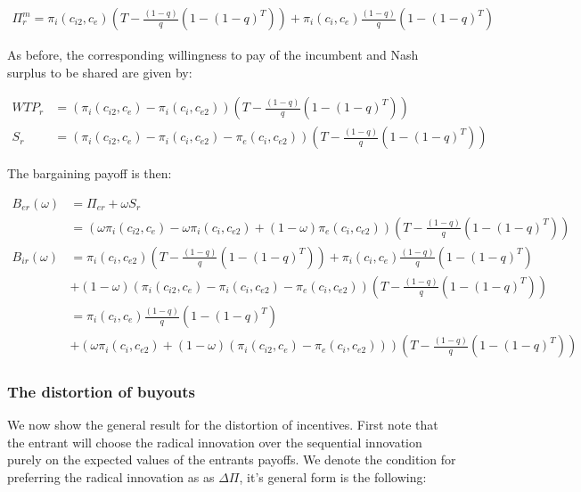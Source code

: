 \begin{align*}
\Pi^m_r = \pi_{i}(c_{i2},c_{e}) \left( T - \frac{(1-q)}{q} \left( 1-(1-q)^T \right) \right)
+\pi_i(c_i,c_e) \frac{(1-q)}{q} \left( 1-(1-q)^T \right)
\end{align*}

As before, the corresponding willingness to pay of the incumbent and Nash surplus to be shared are given by: 

\begin{align*}
WTP_r &= (\pi_{i}(c_{i2},c_{e})-\pi_{i}(c_{i},c_{e2})) \left( T - \frac{(1-q)}{q} \left( 1-(1-q)^T \right) \right) \\
S_r &= (\pi_{i}(c_{i2},c_{e})-\pi_{i}(c_{i},c_{e2})-\pi_{e}(c_{i},c_{e2})) \left( T - \frac{(1-q)}{q} \left( 1-(1-q)^T \right) \right)
\end{align*}

The bargaining payoff is then:

\begin{align*}
B_{er}(\omega) &= \Pi_{er}+\omega S_r \\
&= \left(\omega\pi_{i}(c_{i2},c_{e})-\omega \pi_{i}(c_{i},c_{e2})+(1-\omega)\pi_{e}(c_{i},c_{e2}) \right) \left( T - \frac{(1-q)}{q} \left( 1-(1-q)^T \right) \right) \\
B_{ir}(\omega) &=\pi_{i}(c_i,c_{e2}) \left( T - \frac{(1-q)}{q} \left( 1-(1-q)^T \right) \right)
+\pi_i(c_i,c_e) \frac{(1-q)}{q} \left( 1-(1-q)^T \right)
\\ &+(1-\omega)(\pi_{i}(c_{i2},c_{e})-\pi_{i}(c_{i},c_{e2})-\pi_{e}(c_{i},c_{e2})) \left( T - \frac{(1-q)}{q} \left( 1-(1-q)^T \right) \right) \\
&=\pi_i(c_i,c_e) \frac{(1-q)}{q} \left( 1-(1-q)^T \right)
\\ &+(\omega \pi_i(c_i,c_{e2})+(1-\omega)(\pi_{i}(c_{i2},c_{e})-\pi_{e}(c_{i},c_{e2}))) \left( T - \frac{(1-q)}{q} \left( 1-(1-q)^T \right) \right)
\end{align*}

\subsubsection{The distortion of buyouts}

We now show the general result for the distortion of incentives. First note that the entrant will choose the radical innovation over the sequential innovation purely on the expected values of the entrants payoffs. We denote the condition for preferring the radical innovation as as $\Delta \Pi$, it's general form is the following: 

